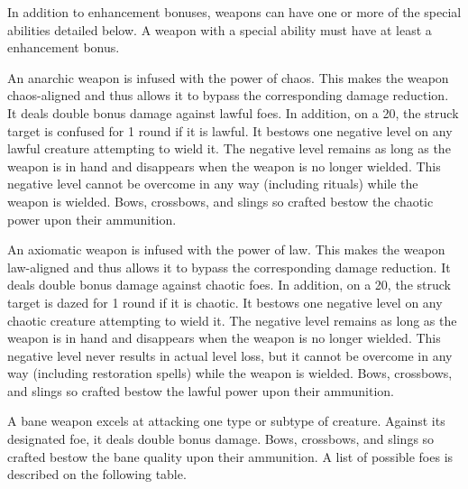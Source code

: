 In addition to enhancement bonuses, weapons can have one or more of the special abilities detailed below. A weapon with a special ability must have at least a  enhancement bonus.

 An anarchic weapon is infused with the power of chaos. This makes the weapon chaos-aligned and thus allows it to bypass the corresponding damage reduction. It deals double bonus damage against lawful foes. In addition, on a 20, the struck target is confused for 1 round if it is lawful. It bestows one negative level on any lawful creature attempting to wield it. The negative level remains as long as the weapon is in hand and disappears when the weapon is no longer wielded. This negative level cannot be overcome in any way (including  rituals) while the weapon is wielded. Bows, crossbows, and slings so crafted bestow the chaotic power upon their ammunition.


 An axiomatic weapon is infused with the power of law. This makes the weapon law-aligned and thus allows it to bypass the corresponding damage reduction. It deals double bonus damage against chaotic foes. In addition, on a 20, the struck target is dazed for 1 round if it is chaotic. It bestows one negative level on any chaotic creature attempting to wield it. The negative level remains as long as the weapon is in hand and disappears when the weapon is no longer wielded. This negative level never results in actual level loss, but it cannot be overcome in any way (including restoration spells) while the weapon is wielded. Bows, crossbows, and slings so crafted bestow the lawful power upon their ammunition.


 A bane weapon excels at attacking one type or subtype of creature. Against its designated foe, it deals double bonus damage. Bows, crossbows, and slings so crafted bestow the bane quality upon their ammunition. A list of possible foes is described on the following table.


